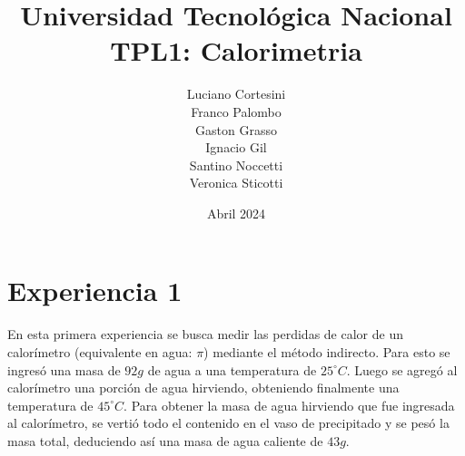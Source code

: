 \documentclass[12pt]{report}
\title{Universidad Tecnológica Nacional\\TPL1: Calorimetria}
\author{
Luciano Cortesini\\
Franco Palombo\\
Gaston Grasso\\
Ignacio Gil\\
Santino Noccetti\\
Veronica Sticotti
}
\date{Abril 2024}
\begin{document}
\maketitle

\section{Experiencia 1}
En esta primera experiencia se busca medir las perdidas de calor de un calorímetro (equivalente en agua: $\pi$) mediante el método indirecto. 
Para esto se ingresó una masa de $92g$ de agua a una temperatura de $25^\circ C$.
Luego se agregó al calorímetro una porción de agua hirviendo, obteniendo finalmente una temperatura de  $45^\circ C$. 
Para obtener la masa de agua hirviendo que fue ingresada al calorímetro, se vertió todo el contenido en el vaso de precipitado y se pesó la masa total, deduciendo así una masa de agua caliente de $43g$.
\end{document}
